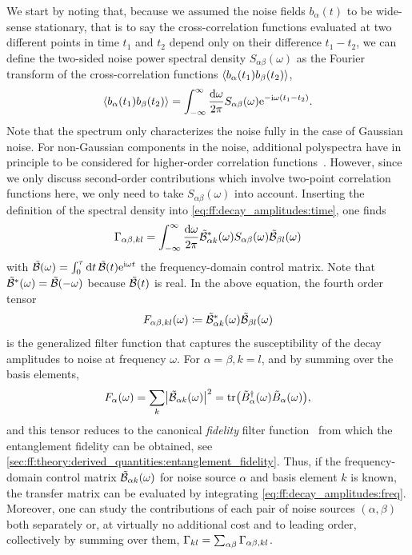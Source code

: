 We start by noting that, because we assumed the noise fields $b_\alpha(t)$ to be wide-sense stationary, that is to say the cross-correlation functions evaluated at two different points in time $t_1$ and $t_2$ depend only on their difference $t_1 - t_2$, we can define the two-sided noise power spectral density $S_{\alpha\beta}(\omega)$ as the Fourier transform of the cross-correlation functions $\expval{b_\alpha(t_1) b_\beta(t_2)}$,
\begin{equation}\label{eq:ff:spectral_density}
    \expval{b_\alpha(t_1) b_{\beta}(t_2)} = \int_{-\infty}^{\infty}\frac{\dd{\omega}}{2\pi} S_{\alpha\beta}(\omega)\mathrm{e}^{-\mathrm{i}\omega (t_1 - t_2)}.
\end{equation}
Note that the spectrum only characterizes the noise fully in the case of Gaussian noise.
For non-Gaussian components in the noise, additional polyspectra have in principle to be considered for higher-order correlation functions~\cite{Norris2016}.
However, since we only discuss second-order contributions which involve two-point correlation functions here, we only need to take $S_{\alpha\beta}(\omega)$ into account.
Inserting the definition of the spectral density into \cref{eq:ff:decay_amplitudes:time}, one finds
\begin{equation}\label{eq:ff:decay_amplitudes:freq}
    \Gamma_{\alpha\beta,kl} = \int_{-\infty}^{\infty}\frac{\dd{\omega}}{2\pi}\tilde{\mathcal{B}}^\ast_{\alpha k}(\omega)S_{\alpha\beta}(\omega)\tilde{\mathcal{B}}_{\beta l}(\omega)
\end{equation}
with $\tilde{\mathcal{B}}(\omega) = \int_0^\tau\dd{t}\tilde{\mathcal{B}}(t)\mathrm{e}^{\mathrm{i}\omega t}$ the frequency-domain control matrix.
Note that $\tilde{\mathcal{B}}^\ast(\omega) = \tilde{\mathcal{B}}(-\omega)$ because $\tilde{\mathcal{B}}(t)$ is real.
In the above equation, the fourth order tensor
\begin{equation}\label{eq:ff:filter_function:generalized}
    F_{\alpha\beta,kl}(\omega)\coloneqq\tilde{\mathcal{B}}^\ast_{\alpha k}(\omega)\tilde{\mathcal{B}}_{\beta l}(\omega)
\end{equation}
is the generalized filter function that captures the susceptibility of the decay amplitudes to noise at frequency $\omega$.
For $\alpha = \beta, k = l$, and by summing over the basis elements,
\begin{equation}\label{eq:ff:filter_function:fidelity}
    F_{\alpha}(\omega) = \sum_k\bigl\lvert\tilde{\mathcal{B}}_{\alpha k}(\omega)\bigr\rvert^2 = \tr(\tilde{B}_\alpha^\dagger(\omega)\tilde{B}_\alpha(\omega)),
\end{equation}
and this tensor reduces to the canonical \emph{fidelity} filter function~\cite{Green2012} from which the entanglement fidelity can be obtained, see \cref{sec:ff:theory:derived_quantities:entanglement_fidelity}.
Thus, if the frequency-domain control matrix $\tilde{\mathcal{B}}_{\alpha k}(\omega)$ for noise source $\alpha$ and basis element $k$ is known, the transfer matrix can be evaluated by integrating \cref{eq:ff:decay_amplitudes:freq}.
Moreover, one can study the contributions of each pair of noise sources $(\alpha, \beta)$ both separately or, at virtually no additional cost and to leading order, collectively by summing over them, $\Gamma_{kl} = \sum_{\alpha\beta}\Gamma_{\alpha\beta,kl}$.

